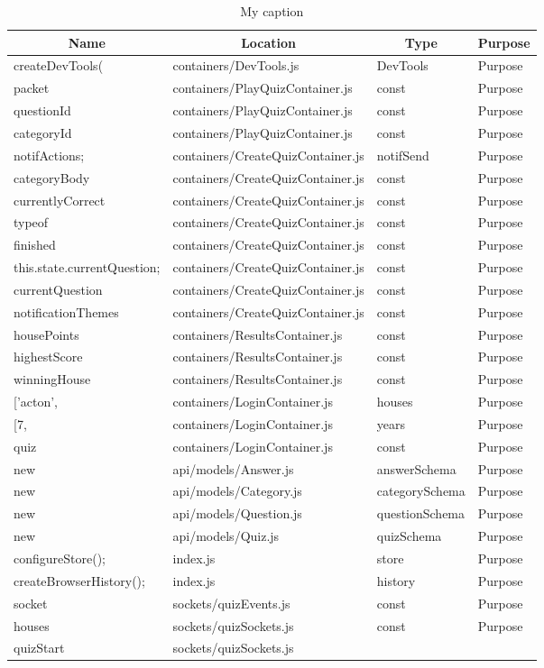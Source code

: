 \begin{table}[]
\centering
\caption{My caption}
\label{my-label}
\begin{tabular}{|l|l|l|l|}
\hline
\multicolumn{1}{|c|}{\textbf{Name}} & \multicolumn{1}{c|}{\textbf{Location}} & \multicolumn{1}{c|}{\textbf{Type}} & \multicolumn{1}{c|}{\textbf{Purpose}} \\ \hline
createDevTools( & containers/DevTools.js & DevTools & Purpose \\ \hline packet & containers/PlayQuizContainer.js & const & Purpose \\ \hline questionId & containers/PlayQuizContainer.js & const & Purpose \\ \hline categoryId & containers/PlayQuizContainer.js & const & Purpose \\ \hline notifActions; & containers/CreateQuizContainer.js & notifSend & Purpose \\ \hline categoryBody & containers/CreateQuizContainer.js & const & Purpose \\ \hline currentlyCorrect & containers/CreateQuizContainer.js & const & Purpose \\ \hline typeof & containers/CreateQuizContainer.js & const & Purpose \\ \hline finished & containers/CreateQuizContainer.js & const & Purpose \\ \hline this.state.currentQuestion; & containers/CreateQuizContainer.js & const & Purpose \\ \hline currentQuestion & containers/CreateQuizContainer.js & const & Purpose \\ \hline notificationThemes & containers/CreateQuizContainer.js & const & Purpose \\ \hline housePoints & containers/ResultsContainer.js & const & Purpose \\ \hline highestScore & containers/ResultsContainer.js & const & Purpose \\ \hline winningHouse & containers/ResultsContainer.js & const & Purpose \\ \hline ['acton', & containers/LoginContainer.js & houses & Purpose \\ \hline [7, & containers/LoginContainer.js & years & Purpose \\ \hline quiz & containers/LoginContainer.js & const & Purpose \\ \hline new & api/models/Answer.js & answerSchema & Purpose \\ \hline new & api/models/Category.js & categorySchema & Purpose \\ \hline new & api/models/Question.js & questionSchema & Purpose \\ \hline new & api/models/Quiz.js & quizSchema & Purpose \\ \hline configureStore(); & index.js & store & Purpose \\ \hline createBrowserHistory(); & index.js & history & Purpose \\ \hline socket & sockets/quizEvents.js & const & Purpose \\ \hline houses & sockets/quizSockets.js & const & Purpose \\ \hline quizStart & sockets/quizSockets.js & 
\end{tabular}
\end{table}

